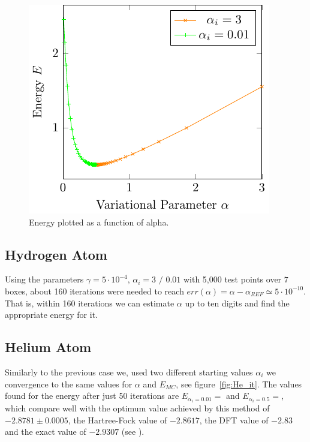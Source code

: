 \begin{figure}
	\begin{center}
		\includegraphics[scale=0.9]{graphs/ho-e-alpha.pdf}
		\caption{
			Energy plotted as a function of alpha. %
		}
		\label{fig:Ho_rel}
	\end{center}
\end{figure}


\subsection{Hydrogen Atom}
Using the parameters
$\gamma = 5\cdot 10^{-4}$, $\alpha_i = 3 \text{~/~}0.01$ with 5,000
test points over $7$ boxes, about 160 iterations were needed to reach
$err(\alpha) = \alpha-\alpha_{REF} \simeq 5 \cdot 10^{-10}$. That is, within 160
iterations we can estimate $\alpha$ up to ten digits and find the appropriate energy for it.


\subsection{Helium Atom}

Similarly to the previous case we,
used two different starting values $\alpha_i$ we convergence to
the same values for $\alpha$ and $E_{MC}$, see figure~\ref{fig:He_it}.
The values found for the energy after just 50 iterations are
$E_{\alpha_i = 0.01} =  $ and $E_{\alpha_i = 0.5} =  $, which
compare well with the optimum value achieved by this method
of $-2.8781 \pm 0.0005$, the Hartree-Fock value of $-2.8617$,
the DFT value of $-2.83$ and the exact value of $-2.9307$ (see \cite{JosBook}). %

